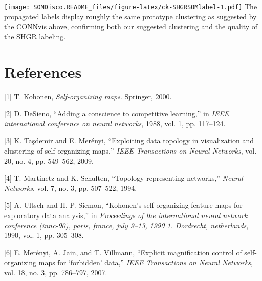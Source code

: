 \documentclass[]{article}
\begin{document}
\texttt{[image: SOMDisco.README\_files/figure-latex/ck-SHGRSOMlabel-1.pdf]}
The propagated labels display roughly the same prototype clustering as suggested by the CONNvis above, confirming both our suggested clustering and the quality of the SHGR labeling.

\hypertarget{references}{%
\section*{References}\label{references}}

\hypertarget{refs}{}
\leavevmode\hypertarget{ref-Kohonen2001}{}%
{[}1{]} T. Kohonen, \emph{Self-organizing maps}. Springer, 2000.

\leavevmode\hypertarget{ref-DeSieno1988}{}%
{[}2{]} D. DeSieno, ``Adding a conscience to competitive learning,'' in \emph{IEEE international conference on neural networks}, 1988, vol. 1, pp. 117--124.

\leavevmode\hypertarget{ref-TasdemirMerenyi2009}{}%
{[}3{]} K. Taşdemir and E. Merényi, ``Exploiting data topology in visualization and clustering of self-organizing maps,'' \emph{IEEE Transactions on Neural Networks}, vol. 20, no. 4, pp. 549--562, 2009.

\leavevmode\hypertarget{ref-MartinetzSchulten1994}{}%
{[}4{]} T. Martinetz and K. Schulten, ``Topology representing networks,'' \emph{Neural Networks}, vol. 7, no. 3, pp. 507--522, 1994.

\leavevmode\hypertarget{ref-UMatrix}{}%
{[}5{]} A. Ultsch and H. P. Siemon, ``Kohonen's self organizing feature maps for exploratory data analysis,'' in \emph{Proceedings of the international neural network conference (innc-90), paris, france, july 9--13, 1990 1. Dordrecht, netherlands}, 1990, vol. 1, pp. 305--308.

\leavevmode\hypertarget{ref-MerenyiJainVillmann}{}%
{[}6{]} E. Merényi, A. Jain, and T. Villmann, ``Explicit magnification control of self-organizing maps for `forbidden' data,'' \emph{IEEE Transactions on Neural Networks}, vol. 18, no. 3, pp. 786--797, 2007.
\end{document}
